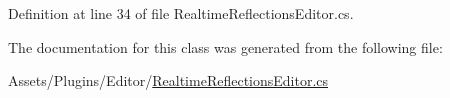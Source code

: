 Definition at line 34 of file Realtime\+Reflections\+Editor.\+cs.



The documentation for this class was generated from the following file\+:\begin{DoxyCompactItemize}
\item 
Assets/\+Plugins/\+Editor/\mbox{\hyperlink{_realtime_reflections_editor_8cs}{Realtime\+Reflections\+Editor.\+cs}}\end{DoxyCompactItemize}
